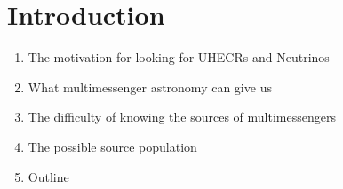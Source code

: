 \section{Introduction}

\begin{enumerate}
    \item The motivation for looking for UHECRs and Neutrinos
    \item What multimessenger astronomy can give us 
    \item The difficulty of knowing the sources of multimessengers
    \item The possible source population
    \item Outline
\end{enumerate}